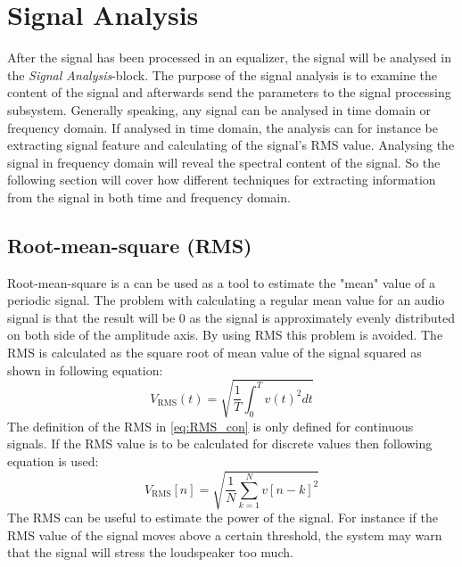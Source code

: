 \section{Signal Analysis}

After the signal has been processed in an equalizer, the signal will be analysed in the \textit{Signal Analysis}-block. The purpose of the signal analysis is to examine the content of the signal and afterwards send the parameters to the signal processing subsystem. Generally speaking, any signal can be analysed in time domain or frequency domain. If analysed in time domain, the analysis can for instance be extracting signal feature and calculating of the signal's RMS value. Analysing the signal in frequency domain will reveal the spectral content of the signal. So the following section will cover how different techniques for extracting information from the signal in both time and frequency domain.



\subsection*{Root-mean-square (RMS)}
Root-mean-square is a can be used as a tool to estimate the "mean" value of a periodic signal. The problem with calculating a regular mean value for an audio signal is that the result will be 0 as the signal is approximately evenly distributed on both side of the amplitude axis. By using RMS this problem is avoided. The RMS is calculated as the square root of mean value of the signal squared as shown in following equation:
\begin{equation}\label{eq:RMS_con}
V_{\text{RMS}}(t) = \sqrt{\frac{1}{T}\int_0^T v(t)^2 dt}
\end{equation}
The definition of the RMS in \autoref{eq:RMS_con} is only defined for continuous signals. If the RMS value is to be calculated for discrete values then following equation is used:
\begin{equation}
V_{\text{RMS}}[n] = \sqrt{\frac{1}{N}\sum_{k=1}^{N} v[n-k]^2}
\end{equation}
The RMS can be useful to estimate the power of the signal. For instance if the RMS value of the signal moves above a certain threshold, the system may warn that the signal will stress the loudspeaker too much.

